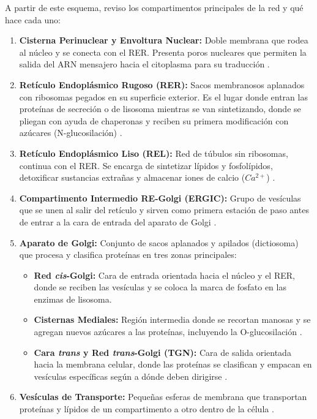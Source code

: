 \documentclass[12pt,spanish,letterpaper,oneside]{article}
\begin{document}
A partir de este esquema, reviso los compartimentos principales de la red y qué hace cada uno:
\begin{enumerate}
    \item \textbf{Cisterna Perinuclear y Envoltura Nuclear:} Doble membrana que rodea al núcleo y se conecta con el RER. Presenta poros nucleares que permiten la salida del ARN mensajero hacia el citoplasma para su traducción \parencite{fortoul2020histologia}.
    \item \textbf{Retículo Endoplásmico Rugoso (RER):} Sacos membranosos aplanados con ribosomas pegados en su superficie exterior. Es el lugar donde entran las proteínas de secreción o de lisosoma mientras se van sintetizando, donde se pliegan con ayuda de chaperonas y reciben su primera modificación con azúcares (N-glucosilación) \parencite{salazar2018biologia}.
    \item \textbf{Retículo Endoplásmico Liso (REL):} Red de túbulos sin ribosomas, continua con el RER. Se encarga de sintetizar lípidos y fosfolípidos, detoxificar sustancias extrañas y almacenar iones de calcio ($Ca^{2+}$) \parencite{karp2019biologia}.
    \item \textbf{Compartimento Intermedio RE-Golgi (ERGIC):} Grupo de vesículas que se unen al salir del retículo y sirven como primera estación de paso antes de entrar a la cara de entrada del aparato de Golgi \parencite{alberts2022molecular}.
    \item \textbf{Aparato de Golgi:} Conjunto de sacos aplanados y apilados (dictiosoma) que procesa y clasifica proteínas en tres zonas principales:
    \begin{itemize}
        \item \textbf{Red \textit{cis}-Golgi:} Cara de entrada orientada hacia el núcleo y el RER, donde se reciben las vesículas y se coloca la marca de fosfato en las enzimas de lisosoma.
        \item \textbf{Cisternas Mediales:} Región intermedia donde se recortan manosas y se agregan nuevos azúcares a las proteínas, incluyendo la O-glucosilación \parencite{mathews2013bioquimica}.
        \item \textbf{Cara \textit{trans} y Red \textit{trans}-Golgi (TGN):} Cara de salida orientada hacia la membrana celular, donde las proteínas se clasifican y empacan en vesículas específicas según a dónde deben dirigirse \parencite{fortoul2020histologia}.
    \end{itemize}
    \item \textbf{Vesículas de Transporte:} Pequeñas esferas de membrana que transportan proteínas y lípidos de un compartimento a otro dentro de la célula \parencite{lodish2021molecular}.

\end{enumerate}
\end{document}
